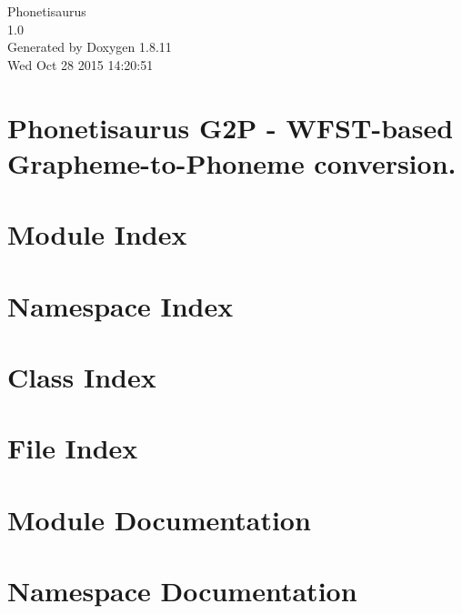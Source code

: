 \documentclass[twoside]{book}
\newcommand{\+}{\discretionary{\mbox{\scriptsize$\hookleftarrow$}}{}{}}
\newcommand{\clearemptydoublepage}{%
  \newpage{\pagestyle{empty}\cleardoublepage}%
}
\begin{document}
\hypersetup{pageanchor=false,
             bookmarks=true,
             bookmarksnumbered=true,
             pdfencoding=unicode
            }
\begin{titlepage}
\vspace*{7cm}
\begin{center}%
{\Large Phonetisaurus \\[1ex]\large 1.\+0 }\\
\vspace*{1cm}
{\large Generated by Doxygen 1.8.11}\\
\vspace*{0.5cm}
{\small Wed Oct 28 2015 14:20:51}\\
\end{center}
\end{titlepage}
\clearemptydoublepage
\tableofcontents
\clearemptydoublepage
{}
\hypersetup{pageanchor=true}

\chapter{Phonetisaurus G2P -\/ W\+F\+S\+T-\/based Grapheme-\/to-\/\+Phoneme conversion.}
\label{index}\hypertarget{index}{}
\chapter{Module Index}

\chapter{Namespace Index}

\chapter{Class Index}

\chapter{File Index}

\chapter{Module Documentation}

\chapter{Namespace Documentation}

\end{document}
